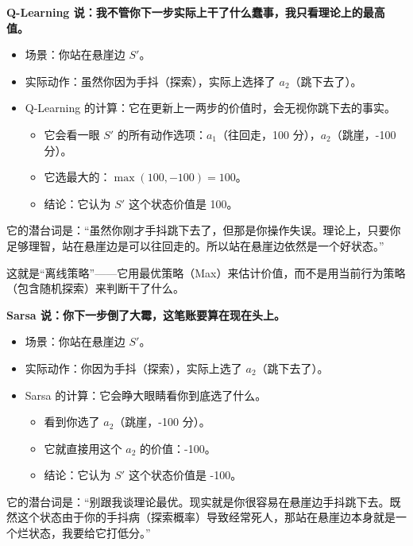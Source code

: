 \textbf{Q-Learning 说：我不管你下一步实际上干了什么蠢事，我只看理论上的最高值。}

\begin{itemize}
\tightlist
\item
  场景：你站在悬崖边 \(S'\)。
\item
  实际动作：虽然你因为手抖（探索），实际上选择了 \(a_2\)（跳下去了）。
\item
  Q-Learning 的计算：它在更新上一两步的价值时，会无视你跳下去的事实。

  \begin{itemize}
  \tightlist
  \item
    它会看一眼 \(S'\) 的所有动作选项：\(a_1\)（往回走，100 分），\(a_2\)（跳崖，-100 分）。
  \item
    它选最大的：\(\max(100,-100)=100\)。
  \item
    结论：它认为 \(S'\) 这个状态价值是 100。
  \end{itemize}
\end{itemize}

它的潜台词是：``虽然你刚才手抖跳下去了，但那是你操作失误。理论上，只要你足够理智，站在悬崖边是可以往回走的。所以站在悬崖边依然是一个好状态。''

这就是``离线策略''------它用最优策略（Max）来估计价值，而不是用当前行为策略（包含随机探索）来判断干了什么。

\textbf{Sarsa 说：你下一步倒了大霉，这笔账要算在现在头上。}

\begin{itemize}
\tightlist
\item
  场景：你站在悬崖边 \(S'\)。
\item
  实际动作：你因为手抖（探索），实际上选了 \(a_2\)（跳下去了）。
\item
  Sarsa 的计算：它会睁大眼睛看你到底选了什么。

  \begin{itemize}
  \tightlist
  \item
    看到你选了 \(a_2\)（跳崖，-100 分）。
  \item
    它就直接用这个 \(a_2\) 的价值：-100。
  \item
    结论：它认为 \(S'\) 这个状态价值是 -100。
  \end{itemize}
\end{itemize}

它的潜台词是：``别跟我谈理论最优。现实就是你很容易在悬崖边手抖跳下去。既然这个状态由于你的手抖病（探索概率）导致经常死人，那站在悬崖边本身就是一个烂状态，我要给它打低分。''

